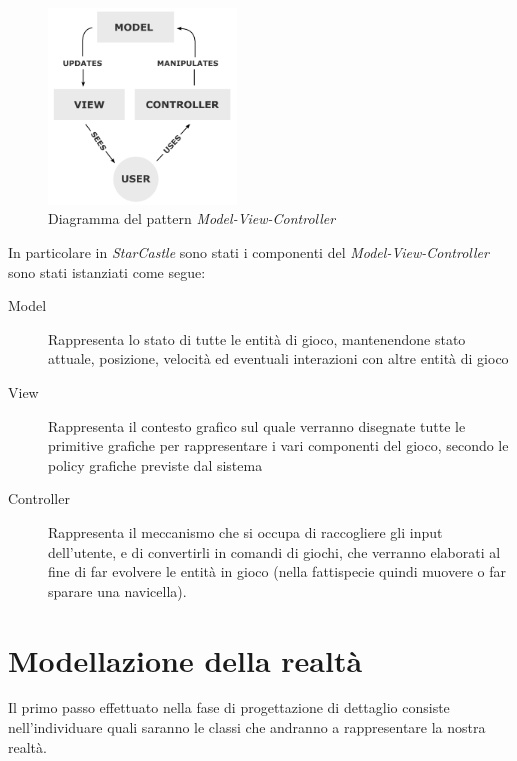 \documentclass[a4paper,12pt]{article}
\begin{document}
\begin{figure}[h]
\centering
\includegraphics[width=5cm]{mvc.png}
\caption{Diagramma del pattern \emph{Model-View-Controller}}
\label{img:mvc}
\end{figure}

In particolare in \emph{StarCastle} sono stati i componenti del \emph{Model-View-Controller} sono stati istanziati come segue:

\begin{description}
\item[\textsf{Model}] Rappresenta lo stato di tutte le entit\`a di gioco, mantenendone stato attuale, posizione, velocit\`a ed eventuali interazioni con altre entit\`a di gioco
\item[\textsf{View}] Rappresenta il contesto grafico sul quale verranno disegnate tutte le primitive grafiche per rappresentare i vari componenti del gioco, secondo le policy grafiche previste dal sistema
\item[\textsf{Controller}] Rappresenta il meccanismo che si occupa di raccogliere gli input dell'utente, e di convertirli in comandi di giochi, che verranno elaborati al fine di far evolvere le entit\`a in gioco (nella fattispecie quindi muovere o far sparare una navicella).
\end{description}

\section{Modellazione della realt\`a}
\label{sec:stato}

Il primo passo effettuato nella fase di progettazione di dettaglio consiste nell'individuare quali saranno le classi che andranno a rappresentare la nostra realt\`a.
\end{document}
